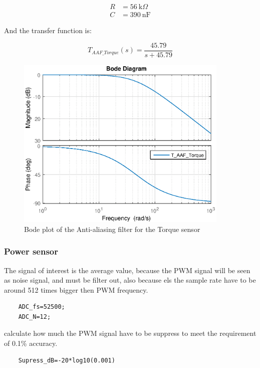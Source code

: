 	\begin{equation}
	\begin{split}
	R &= \SI{56}{\kilo\Omega}\\
	C &= \SI{390}{\nano\F}
	\end{split}
	\end{equation}
	
	And the transfer function is: 
	
	\begin{equation}
	T_{{AAF\_Torque}}(s) = \frac{45.79}{s+ 45.79}
	\end{equation}
	
	
	\begin{figure}[H]
		\centering
		\includegraphics [width=4in]{Hardware/Pictures/FilterAnalyse_01.eps}
		\caption{Bode plot of the Anti-aliasing filter for the Torque sensor}
		\label{fig:BODE_AAF_Torque}
	\end{figure}
	
	
	\subsubsection*{Power sensor}
	
	The signal of interest is the average value, because the PWM signal will be seen as noise signal, and must be filter out, also because els the sample rate have to be around 512 times bigger then PWM frequency.
	
	\begin{lstlisting}
	ADC_fs=52500;
	ADC_N=12;
	\end{lstlisting}
	
	calculate how much the PWM signal have to be suppress to meet the requirement of 0.1\% accuracy.
	
	\begin{lstlisting}
	Supress_dB=-20*log10(0.001)
	\end{lstlisting}


